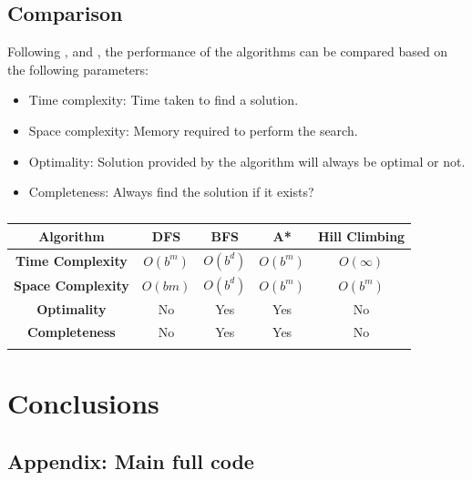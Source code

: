 \documentclass[12pt]{article}
\begin{document}
\subsection{Comparison}
Following \cite{Maharshi2018ComparativeAO}, \cite{HLweb} and \cite{stuart2003artificial}, the performance of the algorithms can be compared based on the following parameters:
\begin{itemize}
    \item Time complexity: Time taken to find a solution.
    \item Space complexity: Memory required to perform the search.
    \item Optimality: Solution provided by the algorithm will always be optimal or not.
    \item Completeness: Always find the solution if it exists?
\end{itemize}
\begin{longtable}[c]{|c|c|c|c|c|}
\hline
\textbf{Algorithm}        & \textbf{DFS} & \textbf{BFS} & \textbf{A*} & \textbf{Hill Climbing} \\ \hline
\endhead
%
\textbf{Time Complexity}  & $O(b^{m})$   & $O(b^{d})$   & $O(b^{m})$  & $O(\infty)$            \\ \hline
\textbf{Space Complexity} & $O(bm)$      & $O(b^{d})$   & $O(b^{m})$  & $O(b^{m})$             \\ \hline
\textbf{Optimality}       & No           & Yes          & Yes         & No                     \\ \hline
\textbf{Completeness}     & No           & Yes          & Yes         & No                     \\ \hline
\caption{}
\label{tab:my-table}\\
\end{longtable}


\section{Conclusions}

\clearpage


\clearpage

\begin{appendices}
  \section{Appendix: Main full code}
  \label{appendix:main}
  
\end{appendices}

\end{document}
